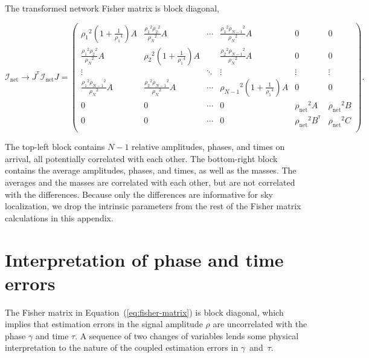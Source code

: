 \documentclass[amsmath,amssymb,aps,prx,reprint,nopreprintnumbers,nofootinbib,showpacs]{revtex4-1}
\newcommand\transpose{\ensuremath{^{^\mathsf{T}}}}
\begin{document}
%
The transformed network Fisher matrix is block diagonal,
%
\begin{widetext}
\begin{equation}
    \mathcal{I}_\mathrm{net} \rightarrow J\transpose \mathcal{I}_\mathrm{net} J = \left(
    \begin{array}{cccccc}
    {\rho_1}^2(1+\frac{1}{{\rho_1}^4}) A & \frac{{\rho_1}^2 {\rho_2}^2}{{\rho_N}^2} A & \cdots & \frac{{\rho_1}^2 {\rho_{N-1}}^2}{{\rho_N}^2} A & 0 & 0 \\
    \frac{{\rho_1}^2 {\rho_2}^2}{{\rho_N}^2} A & {\rho_2}^2(1+\frac{1}{{\rho_1}^4}) A & & \frac{{\rho_2}^2 {\rho_{N-1}}^2}{{\rho_N}^2} A & 0 & 0 \\
    \vdots & & \ddots & \vdots & \vdots & \vdots \\
    \frac{{\rho_1}^2 {\rho_{N-1}}^2}{{\rho_N}^2} A & \frac{{\rho_2}^2 {\rho_{N-1}}^2}{{\rho_N}^2} A & \cdots & {\rho_{N-1}}^2(1+\frac{1}{{\rho_1}^4}) A & 0 & 0 \\
    0 & 0 & \cdots & 0 & {\rho_\mathrm{net}}^2 A & {\rho_\mathrm{net}}^2 B \\
    0 & 0 & \cdots & 0 & {\rho_\mathrm{net}}^2 B\transpose & {\rho_\mathrm{net}}^2 C \\
    \end{array}
    \right).
\end{equation}
\end{widetext}
%
The top\nobreakdashes-left block contains $N-1$ relative amplitudes, phases, and times on arrival, all potentially correlated with each other. The bottom\nobreakdashes-right block contains the average amplitudes, phases, and times, as well as the masses. The averages and the masses are correlated with each other, but are not correlated with the differences. Because only the differences are informative for sky localization, we drop the intrinsic parameters from the rest of the Fisher matrix calculations in this appendix.

\section{Interpretation of phase and time errors}
\label{sec:interpretation-of-errors}

The Fisher matrix in Equation~(\ref{eq:fisher-matrix}) is block diagonal, which implies that estimation errors in the signal amplitude $\rho$ are uncorrelated with the phase $\gamma$ and time $\tau$. A sequence of two changes of variables lends some physical interpretation to the nature of the coupled estimation errors in $\gamma$~and~$\tau$.
\end{document}
